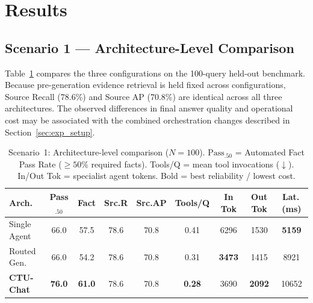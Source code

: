 \section{Results}
\label{sec:results}

\subsection{Scenario 1 --- Architecture-Level Comparison}
\label{sec:s1_results}

Table~\ref{tab:arch_comparison} compares the three configurations on the 100-query held-out benchmark. Because pre-generation evidence retrieval is held fixed across configurations, Source Recall (78.6\%) and Source AP (70.8\%) are identical across all three architectures. The observed differences in final answer quality and operational cost may be associated with the combined orchestration changes described in Section~\ref{sec:exp_setup}.

\begin{table}[!htbp]
\centering
\caption{Scenario~1: Architecture-level comparison ($N=100$). $\text{Pass}_{.50}$ = Automated Fact Pass Rate ($\ge 50\%$ required facts). Tools/Q = mean tool invocations ($\downarrow$). In/Out Tok = specialist agent tokens. Bold = best reliability / lowest cost.}
\label{tab:arch_comparison}
{\small\setlength{\tabcolsep}{3.5pt}
\begin{tabular}{lcccccccc}
\toprule
\textbf{Arch.} & \textbf{Pass$_{.50}$} & \textbf{Fact} & \textbf{Src.R} & \textbf{Src.AP} & \textbf{Tools/Q} & \textbf{In Tok} & \textbf{Out Tok} & \textbf{Lat.\,(ms)} \\
\midrule
Single Agent   & 66.0 & 57.5 & 78.6 & 70.8 & 0.41 & 6296 & 1530 & \textbf{5159} \\
Routed Gen.    & 66.0 & 54.2 & 78.6 & 70.8 & 0.31 & \textbf{3473} & 1415 & 8921 \\
\textbf{CTU-Chat} & \textbf{76.0} & \textbf{61.0} & 78.6 & 70.8 & \textbf{0.28} & 3690 & \textbf{2092} & 10652 \\
\bottomrule
\end{tabular}}
\end{table}


